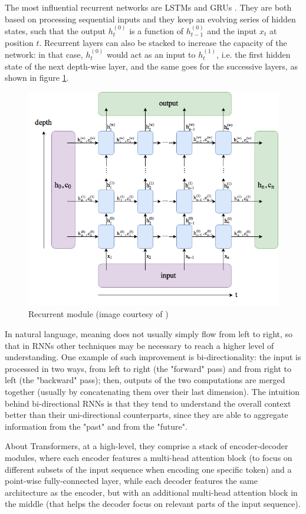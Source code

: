 \documentclass[a4paper,10pt]{report}
\begin{document}
The most influential recurrent networks are LSTMs \cite{lstm} and GRUs \cite{gru}. They are both based on processing sequential inputs and they keep an evolving series of hidden states, such that the output $h_t^{(0)}$ is a function of $h_{t-1}^{(0)}$ and the input $x_t$ at position $t$. Recurrent layers can also be stacked to increase the capacity of the network: in that case, $h_t^{(0)}$ would act as an input to $h_t^{(1)}$, i.e. the first hidden state of the next depth-wise layer, and the same goes for the successive layers, as shown in figure \ref{fig:recurrent}.

\begin{figure}[h]
  \center
  \includegraphics[width=0.65\linewidth]{recurrent}
  \caption{Recurrent module (image courtesy of \cite{recurrent-img})}
  \label{fig:recurrent}
\end{figure}

In natural language, meaning does not usually simply flow from left to right, so that in RNNs other techniques may be necessary to reach a higher level of understanding. One example of such improvement is bi-directionality: the input is processed in two ways, from left to right (the "forward" pass) and from right to left (the "backward" pass); then, outputs of the two computations are merged together (usually by concatenating them over their last dimension). The intuition behind bi-directional RNNs is that they tend to understand the overall context better than their uni-directional counterparts, since they are able to aggregate information from the "past" and from the "future".

About Transformers, at a high-level, they comprise a stack of encoder-decoder modules, where each encoder features a multi-head attention block (to focus on different subsets of the input sequence when encoding one specific token) and a point-wise fully-connected layer, while each decoder features the same architecture as the encoder, but with an additional multi-head attention block in the middle (that helps the decoder focus on relevant parts of the input sequence).
\end{document}
